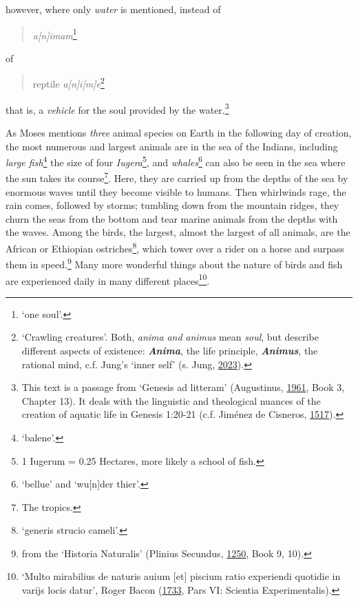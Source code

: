 \documentclass[
]{article}
\begin{document}
however, where only \emph{water} is mentioned, instead of

\begin{quote}
\emph{a{[}n{]}imam}\footnote{`one soul'.}
\end{quote}

of

\begin{quote}
reptile \emph{a{[}n{]}i{[}m{]}e}\footnote{`Crawling creatures'. Both,
  \emph{anima} \emph{and} \emph{animus} mean \emph{soul}, but describe
  different aspects of existence: \textbf{\emph{Anima}}, the life
  principle, \textbf{\emph{Animus}}, the rational mind, c.f. Jung's
  `inner self' (s. Jung,
  \href{https://books.google.com/books?id=cX3VEAAAQBAJ}{2023}).}
\end{quote}

that is, a \emph{vehicle} for the soul provided by the water.\footnote{This
  text is a passage from `Genesis ad litteram' (Augustinus,
  \href{https://mdz-nbn-resolving.de/details:bsb00046071}{1961}, Book 3,
  Chapter 13). It deals with the linguistic and theological nuances of
  the creation of aquatic life in Genesis 1:20-21 (c.f. Jiménez de
  Cisneros, \href{https://doi.org/10.3931/e-rara-46695}{1517}).}

As Moses mentions \emph{three} animal species on Earth in the following
day of creation, the most numerous and largest animals are in the sea of
\hspace{0pt}\hspace{0pt}the Indians, including \emph{large
fish}\footnote{`balene'.} the size of four \emph{Iugera}\footnote{1
  Iugerum = 0.25 Hectares, more likely a school of fish.}, and
\emph{whales}\footnote{`bellue' and `wu{[}n{]}der thier'.} can also be
seen in the sea where the sun takes its course\footnote{The tropics.}.
Here, they are carried up from the depths of the sea by enormous waves
until they become visible to humans. Then whirlwinds rage, the rain
comes, followed by storms; tumbling down from the mountain ridges, they
churn the seas from the bottom and tear marine animals from the depths
with the waves. Among the birds, the largest, almost the largest of all
animals, are the African or Ethiopian ostriches\footnote{`generis
  strucio cameli'.}, which tower over a rider on a horse and surpass
them in speed.\footnote{from the `Historia Naturalis' (Plinius Secundus,
  \href{https://gallica.bnf.fr/ark:/12148/btv1b550140045/}{1250}, Book
  9, 10).} Many more wonderful things about the nature of birds and fish
are experienced daily in many different places\footnote{`Multo
  mirabilius de naturis auium {[}et{]} piscium ratio experiendi quotidie
  in varijs locis datur', Roger Bacon
  (\href{https://doi.org/10.3931/e-rara-16491}{1733}, Pars VI: Scientia
  Experimentalis).}.
\end{document}
